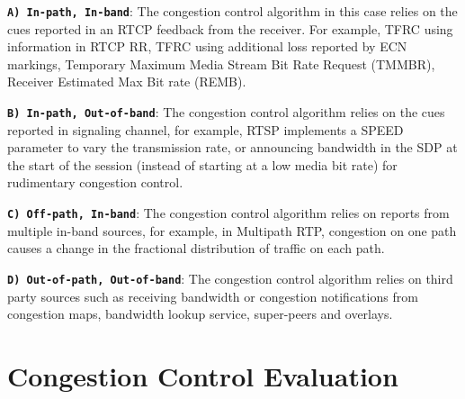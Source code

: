 \textbf{\texttt{A) In-path, In-band}}: The congestion control algorithm in
this case relies on the cues reported in an RTCP feedback from the receiver.
For example, TFRC using information in RTCP RR, TFRC using additional loss
reported by ECN markings, Temporary Maximum Media Stream Bit Rate Request
(TMMBR), Receiver Estimated Max Bit rate (REMB).

\textbf{\texttt{B) In-path, Out-of-band}}: The congestion control algorithm
relies on the cues reported in signaling channel, for example, RTSP implements
a SPEED parameter to vary the transmission rate, or announcing bandwidth in
the SDP at the start of the session (instead of starting at a low media bit
rate) for rudimentary congestion control.

\textbf{\texttt{C) Off-path, In-band}}: The congestion control algorithm
relies on reports from multiple in-band sources, for example, in Multipath
RTP, congestion on one path causes a change in the fractional distribution of
traffic on each path.

\textbf{\texttt{D) Out-of-path, Out-of-band}}: The congestion control
algorithm relies on third party sources such as receiving bandwidth or
congestion notifications from congestion maps, bandwidth lookup service,
super-peers and overlays.




\section{Congestion Control Evaluation}
\label{fw.cc.eval}


